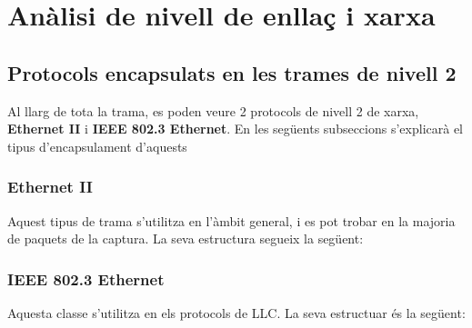 \documentclass{article}
\begin{document}
\section{Anàlisi de nivell de enllaç i xarxa}
\subsection{Protocols encapsulats en les trames de nivell 2}
Al llarg de tota la trama, es poden veure 2 protocols de nivell 2 de
xarxa, \textbf{Ethernet II} i \textbf{IEEE 802.3 Ethernet}. En les següents
subseccions s'explicarà el tipus d'encapsulament d'aquests
\subsubsection{Ethernet II}
Aquest tipus de trama s'utilitza en l'àmbit general, i es pot trobar en la majoria
de paquets de la captura. La seva estructura segueix la següent:\\
\subsubsection{IEEE 802.3 Ethernet}
Aquesta classe s'utilitza en els protocols de LLC. La seva estructuar és la
següent:
\end{document}
